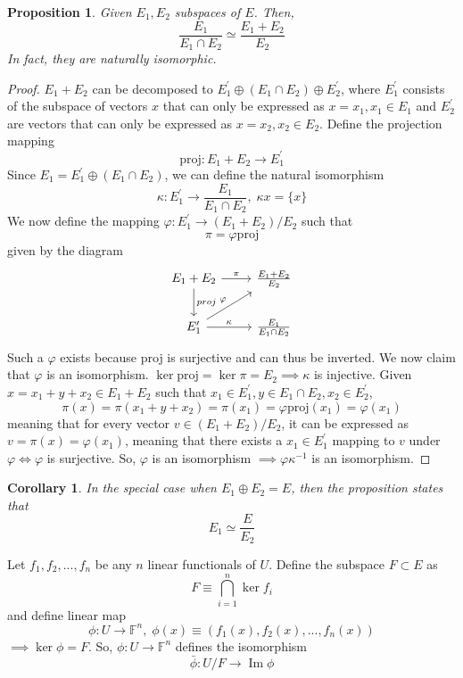 \documentclass{article}
\DeclareMathOperator{\im}{Im}
\newtheorem{proposition}[theorem]{Proposition}
\newtheorem{corollary}{Corollary}[theorem]
\theoremstyle{remark}
\theoremstyle{definition}
\begin{document}
    \begin{proposition}
    Given $E_1, E_2$ subspaces of $E$. Then, 
    \[\frac{E_1}{E_1 \cap E_2} \simeq \frac{E_1 + E_2}{E_2}\]
    In fact, they are naturally isomorphic. 
    \end{proposition}
    \begin{proof}
    $E_1 + E_2$ can be decomposed to $E_1^\prime \oplus (E_1 \cap E_2) \oplus E_2^\prime$, where $E_1^\prime$ consists of the subspace of vectors $x$ that can only be expressed as $x = x_1, x_1 \in E_1$ and $E_2^\prime$ are vectors that can only be expressed as $x = x_2, x_2 \in E_2$. Define the projection mapping
    \[\text{proj}: E_1 + E_2 \longrightarrow E_1^\prime\]
    Since $E_1 = E_1^\prime \oplus (E_1 \cap E_2)$, we can define the natural isomorphism 
    \[\kappa: E_1^\prime \longrightarrow \frac{E_1}{E_1 \cap E_2}, \; \kappa{x} = \{x\}\]
    We now define the mapping $\varphi: E_1^\prime \longrightarrow (E_1 + E_2) / E_2$ such that
    \[\pi = \varphi \text{proj}\]
    given by the diagram 
    \[\begin{tikzcd} 
        E_1 + E_2 \arrow{d}{proj} \arrow{r}{\pi} & \frac{E_1 + E_2}{E_2} \\
        E_1^\prime \arrow{ru}{\varphi} \arrow{r}{\kappa} & \frac{E_1}{E_1 \cap E_2}
    \end{tikzcd}\]
    Such a $\varphi$ exists because proj is surjective and can thus be inverted. We now claim that $\varphi$ is an isomorphism. $\ker{\text{proj}} = \ker{\pi} = E_2 \implies \kappa$ is injective. Given $x = x_1 + y + x_2 \in E_1 + E_2$ such that $x_1 \in E_1^\prime, y \in E_1 \cap E_2, x_2 \in E_2^\prime$, 
    \[\pi(x) = \pi(x_1 + y + x_2) = \pi(x_1) = \varphi \text{proj} (x_1) = \varphi (x_1)\]
    meaning that for every vector $v \in (E_1 + E_2) / E_2$, it can be expressed as $v = \pi (x) = \varphi (x_1)$, meaning that there exists a $x_1 \in E_1^\prime$ mapping to $v$ under $\varphi \iff \varphi$ is surjective. So, $\varphi$ is an isomorphism $\implies \varphi \kappa^{-1}$ is an isomorphism.  
    \end{proof}

    \begin{corollary}
    In the special case when $E_1 \oplus E_2 = E$, then the proposition states that 
    \[E_1 \simeq \frac{E}{E_2}\]
    \end{corollary}

    Let $f_1, f_2, ..., f_n$ be any $n$ linear functionals of $U$. Define the subspace $F \subset E$ as 
    \[ F \equiv \bigcap_{i=1}^n \ker{f_i}\]
    and define linear map 
    \[\phi: U \longrightarrow \mathbb{F}^n, \;\phi(x) \equiv (f_1(x), f_2(x), ..., f_n(x))\]
    $\implies \ker{\phi} = F$. So, $\phi: U \longrightarrow \mathbb{F}^n$ defines the isomorphism 
    \[\bar{\phi}: U / F \longrightarrow \im{\phi}\]
\end{document}
